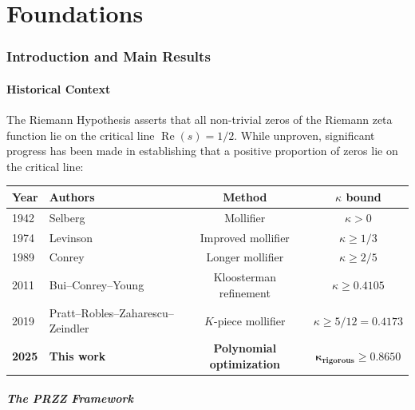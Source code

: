 \documentclass[11pt]{article}
\begin{document}
\tableofcontents
\newpage


\part{Foundations}

\section{Introduction and Main Results}

\subsection{Historical Context}

The Riemann Hypothesis asserts that all non-trivial zeros of the Riemann zeta function lie on the critical line $\operatorname{Re}(s) = 1/2$. While unproven, significant progress has been made in establishing that a positive proportion of zeros lie on the critical line:

\begin{center}
\begin{tabular}{llcc}
\toprule
Year & Authors & Method & $\kappa$ bound \\
\midrule
1942 & Selberg & Mollifier & $\kappa > 0$ \\
1974 & Levinson & Improved mollifier & $\kappa \geq 1/3$ \\
1989 & Conrey & Longer mollifier & $\kappa \geq 2/5$ \\
2011 & Bui--Conrey--Young & Kloosterman refinement & $\kappa \geq 0.4105$ \\
2019 & Pratt--Robles--Zaharescu--Zeindler & $K$-piece mollifier & $\kappa \geq 5/12 = 0.4173$ \\
\textbf{2025} & \textbf{This work} & \textbf{Polynomial optimization} & $\bm{\kappa_{\text{rigorous}} \geq 0.8650}$ \\
\bottomrule
\end{tabular}
\end{center}

\subsubsection{The PRZZ Framework}
\end{document}

